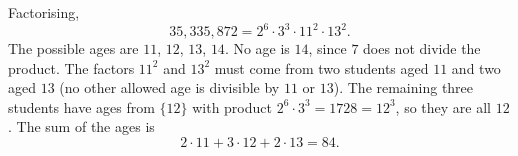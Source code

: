Factorising,
\[35{,}335{,}872=2^6\cdot3^3\cdot11^2\cdot13^2 .\]
The possible ages are $11$, $12$, $13$, $14$. No age is $14$, since $7$ does not divide the product. The factors $11^2$ and $13^2$ must come from two students aged $11$ and two aged $13$ (no other allowed age is divisible by $11$ or $13$). The remaining three students have ages from $\{12\}$ with product $2^6\cdot3^3=1728=12^3$, so they are all $12$. The sum of the ages is
\[2\cdot11+3\cdot12+2\cdot13=\boxed{84}.\]
